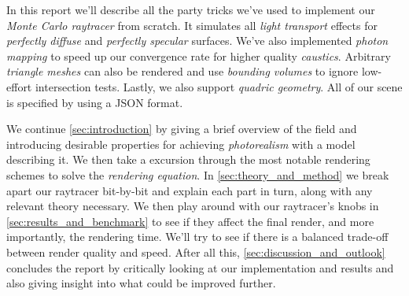 \documentclass[a4paper, twocolumn]{article}
\begin{document}
        In this report we'll describe all the party tricks we've used to implement our \emph{Monte Carlo raytracer} from scratch. It simulates all \emph{light transport} effects for \emph{perfectly diffuse} and \emph{perfectly specular} surfaces. We've also implemented \emph{photon mapping} to speed up our convergence rate for higher quality \emph{caustics}. Arbitrary \emph{triangle meshes} can also be rendered and use \emph{bounding volumes} to ignore low-effort intersection tests. Lastly, we also support \emph{quadric geometry}. All of our scene is specified by using a JSON format.

        We continue \cref{sec:introduction} by giving a brief overview of the field and introducing desirable properties for achieving \emph{photorealism} with a model describing it. We then take a excursion through the most notable rendering schemes to solve the \emph{rendering equation}. In \cref{sec:theory_and_method} we break apart our raytracer bit-by-bit and explain each part in turn, along with any relevant theory necessary. We then play around with our raytracer's knobs in \cref{sec:results_and_benchmark} to see if they affect the final render, and more importantly, the rendering time. We'll try to see if there is a balanced trade-off between render quality and speed. After all this, \cref{sec:discussion_and_outlook} concludes the report by critically looking at our implementation and results and also giving insight into what could be improved further.
\end{document}
